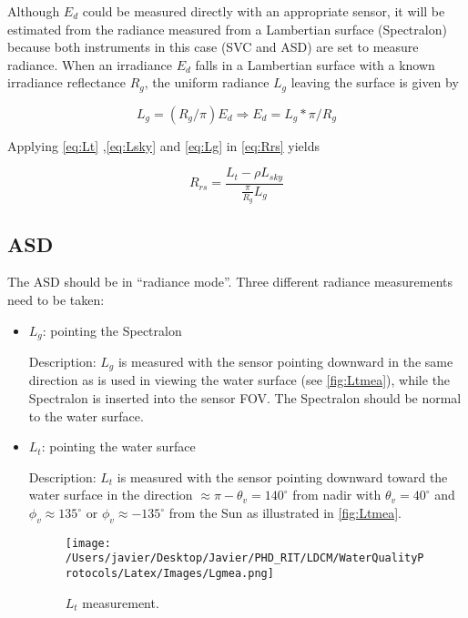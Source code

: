 \begin{appendices}
Although $E_d$ could be measured directly with an appropriate sensor, it will be estimated from the radiance measured from a Lambertian surface (Spectralon) because both instruments in this case (SVC and ASD) are set to measure radiance. When an irradiance $E_d$ falls in a Lambertian surface with a known irradiance reflectance $R_g$, the uniform radiance $L_g$ leaving the surface is given by 

\begin{equation}\label{eq:Lg}
	L_g = (R_g/\pi)E_d\Rightarrow E_d = L_g*\pi/R_g
\end{equation}

Applying \autoref{eq:Lt} ,\autoref{eq:Lsky} and \autoref{eq:Lg} in \autoref{eq:Rrs} yields

\begin{equation}
	R_{rs} = \frac{L_t-\rho L_{sky}}{\frac{\displaystyle \pi}{\displaystyle R_g}L_g}
\end{equation}

\subsection{ASD}

The ASD should be in ``radiance mode''. Three different radiance measurements need to be taken:
\begin{itemize}
	\item $L_g$: pointing the Spectralon

Description: $L_g$ is measured with the sensor pointing downward in the same direction as is used in viewing the water surface (see \autoref{fig:Ltmea}), while the Spectralon is inserted into the sensor FOV. The Spectralon should be normal to the water surface.

	\item $L_t$: pointing the water surface

Description: $L_t$ is measured with the sensor pointing downward toward the water surface in the direction $\approx \pi-\theta_v = 140^\circ$ from nadir with $\theta_v = 40^\circ$ and $\phi_v \approx 135^\circ$ or $\phi_v \approx -135^\circ$ from the Sun as illustrated in \autoref{fig:Ltmea}.

\begin{figure}[htb]
\centering
    \texttt{[image: /Users/javier/Desktop/Javier/PHD\_RIT/LDCM/WaterQualityProtocols/Latex/Images/Lgmea.png]}
    \vspace{0.5cm}
   \caption[]{\label{fig:Ltmea} $L_t$ measurement.}
\end{figure}


\end{itemize}
\end{appendices}
